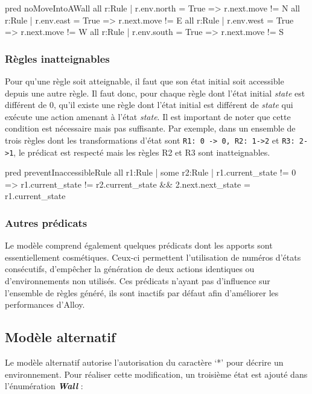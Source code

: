 \documentclass{article}
\begin{document}
\begin{alloy}
pred noMoveIntoAWall {
  all r:Rule | r.env.north = True => r.next.move != N
  all r:Rule | r.env.east = True => r.next.move != E
  all r:Rule | r.env.west = True => r.next.move != W
  all r:Rule | r.env.south = True => r.next.move != S
}
\end{alloy}

\subsubsection*{Règles inatteignables}
Pour qu’une règle soit atteignable, il faut que son état initial soit accessible depuis une autre règle. Il faut donc, pour chaque règle dont l’état initial \textit{state} est différent de 0, qu’il existe une règle dont l’état initial est différent de \textit{state} qui exécute une action amenant à l’état \textit{state}. Il est important de noter que cette condition est nécessaire mais pas suffisante. Par exemple, dans un ensemble de trois règles dont les transformations d’état sont \texttt{R1: 0 -> 0, R2: 1->2} et \texttt{R3: 2->1}, le prédicat est respecté mais les règles R2 et R3 sont inatteignables.

\begin{alloy}
pred preventInaccessibleRule {
  all r1:Rule | some r2:Rule | r1.current_state != 0 => r1.current_state != r2.current_state && 2.next.next_state = r1.current_state
}
\end{alloy}

\subsubsection{Autres prédicats}
Le modèle comprend également quelques prédicats dont les apports sont essentiellement cosmétiques. Ceux-ci permettent l'utilisation de numéros d’états consécutifs, d'empêcher la génération de deux actions identiques ou d’environnements non utilisés. Ces prédicats n'ayant pas d'influence sur l'ensemble de règles généré, ils sont inactifs par défaut afin d'améliorer les performances d'Alloy.

\subsection{Modèle alternatif}
Le modèle alternatif autorise l'autorisation du caractère ‘*’ pour décrire un environnement. Pour réaliser cette modification, un troisième état est ajouté dans l’énumération \textit{\textbf{Wall}} :
\end{document}
